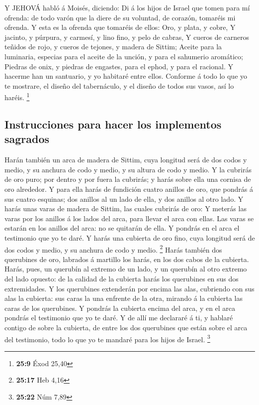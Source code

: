  Y JEHOVÁ habló á Moisés, diciendo:  Di á los
hijos de Israel que tomen para mí ofrenda: de todo varón que la diere de
su voluntad, de corazón, tomaréis mi ofrenda.  Y esta es la
ofrenda que tomaréis de ellos: Oro, y plata, y cobre,  Y
jacinto, y púrpura, y carmesí, y lino fino, y pelo de cabras,
 Y cueros de carneros teñidos de rojo, y cueros de tejones,
y madera de Sittim;  Aceite para la luminaria, especias para
el aceite de la unción, y para el sahumerio aromático; 
Piedras de onix, y piedras de engastes, para el ephod, y para el
racional.  Y hacerme han un santuario, y yo habitaré entre
ellos.  Conforme á todo lo que yo te mostrare, el diseño del
tabernáculo, y el diseño de todos sus vasos, así lo haréis. \footnote{\textbf{25:9}
  Éxod 25,40}

\hypertarget{instrucciones-para-hacer-los-implementos-sagrados}{%
\subsection{Instrucciones para hacer los implementos
sagrados}\label{instrucciones-para-hacer-los-implementos-sagrados}}

 Harán también un arca de madera de Sittim, cuya longitud
será de dos codos y medio, y su anchura de codo y medio, y su altura de
codo y medio.  Y la cubrirás de oro puro; por dentro y por
fuera la cubrirás; y harás sobre ella una cornisa de oro alrededor.
 Y para ella harás de fundición cuatro anillos de oro, que
pondrás á sus cuatro esquinas; dos anillos al un lado de ella, y dos
anillos al otro lado.  Y harás unas varas de madera de
Sittim, las cuales cubrirás de oro:  Y meterás las varas
por los anillos á los lados del arca, para llevar el arca con ellas.
 Las varas se estarán en los anillos del arca: no se
quitarán de ella.  Y pondrás en el arca el testimonio que
yo te daré.  Y harás una cubierta de oro fino, cuya
longitud será de dos codos y medio, y su anchura de codo y medio.
\footnote{\textbf{25:17} Heb 4,16}  Harás también dos
querubines de oro, labrados á martillo los harás, en los dos cabos de la
cubierta.  Harás, pues, un querubín al extremo de un lado,
y un querubín al otro extremo del lado opuesto: de la calidad de la
cubierta harás los querubines en sus dos extremidades.  Y
los querubines extenderán por encima las alas, cubriendo con sus alas la
cubierta: sus caras la una enfrente de la otra, mirando á la cubierta
las caras de los querubines.  Y pondrás la cubierta encima
del arca, y en el arca pondrás el testimonio que yo te daré.
 Y de allí me declararé á ti, y hablaré contigo de sobre la
cubierta, de entre los dos querubines que están sobre el arca del
testimonio, todo lo que yo te mandaré para los hijos de Israel.
\footnote{\textbf{25:22} Núm 7,89}

